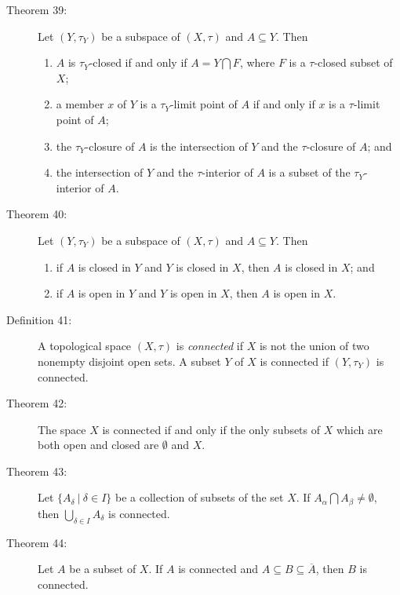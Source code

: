 \documentclass{article}
\begin{document}
\begin{description}
  \item[Theorem 39:] Let $(Y, \tau_{Y})$ be a subspace of $(X,\tau)$ and $A \subseteq Y$. Then
    \begin{enumerate}[\hspace{1cm}1.]
      \item $A$ is $\tau_{Y}$-closed if and only if $A = Y \bigcap F$, where $F$ is a $\tau$-closed subset of $X$;
      \item a member $x$ of $Y$ is a $\tau_{Y}$-limit point of $A$ if and only if $x$ is a $\tau$-limit point of $A$;
      \item the $\tau_{Y}$-closure of $A$ is the intersection of $Y$ and the $\tau$-closure of $A$; and
      \item the intersection of $Y$ and the $\tau$-interior of $A$ is a subset of the $\tau_{Y}$-interior of $A$.
    \end{enumerate}

  \item[Theorem 40:] Let $(Y, \tau_{Y})$ be a subspace of $(X,\tau)$ and $A \subseteq Y$. Then
    \begin{enumerate}[\hspace{1cm}1.]
      \item if $A$ is closed in $Y$ and $Y$ is closed in $X$, then $A$ is closed in $X$; and
      \item if $A$ is open in $Y$ and $Y$ is open in $X$, then $A$ is open in $X$.
    \end{enumerate}

  \item[Definition 41:] A topological space $(X,\tau)$ is \emph{connected} if $X$ is not the union of two nonempty disjoint open sets. A subset $Y$ of $X$ is connected if $(Y, \tau_{Y})$ is connected.

  \item[Theorem 42:] The space $X$ is connected if and only if the only subsets of $X$ which are both open and closed are $\emptyset$ and $X$.

  \item[Theorem 43:] Let $\{ A_{\delta} \ \vert \ \delta \in I \}$ be a collection of subsets of the set $X$. If $A_{\alpha} \bigcap A_{\beta} \neq \emptyset$, then $\displaystyle{ \bigcup_{\delta \in I} A_{\delta} }$ is connected.

  \item[Theorem 44:] Let $A$ be a subset of $X$. If $A$ is connected and $A \subseteq B \subseteq \overline{A}$, then $B$ is connected.


\end{description}
\end{document}
